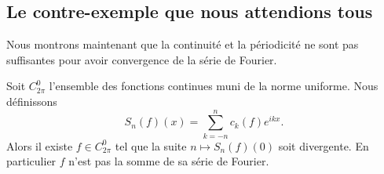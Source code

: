 \subsection{Le contre-exemple que nous attendions tous}

Nous montrons maintenant que la continuité et la périodicité ne sont pas suffisantes pour avoir convergence de la série de Fourier.

\begin{proposition} \label{PropREkHdol}
    Soit \( C^0_{2\pi}\) l'ensemble des fonctions continues muni de la norme uniforme. Nous définissons
    \begin{equation}
        S_n(f)(x)=\sum_{k=-n}^nc_k(f) e^{ikx}.
    \end{equation}
    Alors il existe \( f\in C^0_{2\pi}\) tel que la suite \(n\mapsto S_n(f)(0)\) soit divergente. En particulier \( f\) n'est pas la somme de sa série de Fourier.
\end{proposition}

